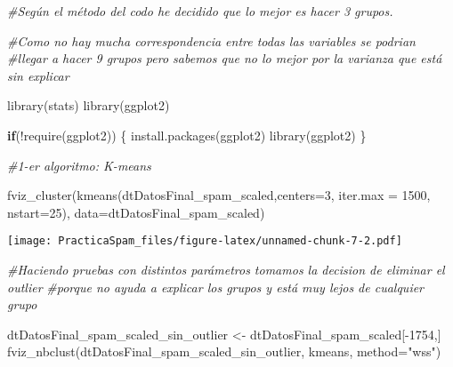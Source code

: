 \documentclass[
]{article}
\newenvironment{Shaded}{\begin{snugshade}}{\end{snugshade}}
\newcommand{\AttributeTok}[1]{\textcolor[rgb]{0.77,0.63,0.00}{#1}}
\newcommand{\CommentTok}[1]{\textcolor[rgb]{0.56,0.35,0.01}{\textit{#1}}}
\newcommand{\ControlFlowTok}[1]{\textcolor[rgb]{0.13,0.29,0.53}{\textbf{#1}}}
\newcommand{\DecValTok}[1]{\textcolor[rgb]{0.00,0.00,0.81}{#1}}
\newcommand{\FunctionTok}[1]{\textcolor[rgb]{0.00,0.00,0.00}{#1}}
\newcommand{\NormalTok}[1]{#1}
\newcommand{\OtherTok}[1]{\textcolor[rgb]{0.56,0.35,0.01}{#1}}
\newcommand{\SpecialCharTok}[1]{\textcolor[rgb]{0.00,0.00,0.00}{#1}}
\newcommand{\StringTok}[1]{\textcolor[rgb]{0.31,0.60,0.02}{#1}}
\begin{document}
\begin{Shaded}
\begin{Highlighting}[]
  \CommentTok{\#Según el método del codo he decidido que lo mejor es hacer 3 grupos.}
  
  \CommentTok{\#Como no hay mucha correspondencia entre todas las variables se podrian}
  \CommentTok{\#llegar a hacer 9 grupos pero sabemos que no lo mejor por la varianza que está sin explicar}
  
  
  
  \FunctionTok{library}\NormalTok{(stats)}
  \FunctionTok{library}\NormalTok{(ggplot2)}
  
  \ControlFlowTok{if}\NormalTok{(}\SpecialCharTok{!}\FunctionTok{require}\NormalTok{(}\StringTok{\textquotesingle{}ggplot2\textquotesingle{}}\NormalTok{)) \{}
    \FunctionTok{install.packages}\NormalTok{(}\StringTok{\textquotesingle{}ggplot2\textquotesingle{}}\NormalTok{)}
    \FunctionTok{library}\NormalTok{(}\StringTok{\textquotesingle{}ggplot2\textquotesingle{}}\NormalTok{)}
\NormalTok{  \}}
  
  \CommentTok{\#1{-}er algoritmo: K{-}means}
  
  \FunctionTok{fviz\_cluster}\NormalTok{(}\FunctionTok{kmeans}\NormalTok{(dtDatosFinal\_spam\_scaled,}\AttributeTok{centers=}\DecValTok{3}\NormalTok{, }\AttributeTok{iter.max =} \DecValTok{1500}\NormalTok{, }\AttributeTok{nstart=}\DecValTok{25}\NormalTok{), }\AttributeTok{data=}\NormalTok{dtDatosFinal\_spam\_scaled)}
\end{Highlighting}
\end{Shaded}

\texttt{[image: PracticaSpam\_files/figure-latex/unnamed-chunk-7-2.pdf]}

\begin{Shaded}
\begin{Highlighting}[]
  \CommentTok{\#Haciendo pruebas con distintos parámetros tomamos la decision de eliminar el outlier}
  \CommentTok{\#porque no ayuda a explicar los grupos y está muy lejos de cualquier grupo}
  
\NormalTok{  dtDatosFinal\_spam\_scaled\_sin\_outlier }\OtherTok{\textless{}{-}}\NormalTok{ dtDatosFinal\_spam\_scaled[}\SpecialCharTok{{-}}\DecValTok{1754}\NormalTok{,]}
  \FunctionTok{fviz\_nbclust}\NormalTok{(dtDatosFinal\_spam\_scaled\_sin\_outlier, kmeans, }\AttributeTok{method=}\StringTok{"wss"}\NormalTok{)}
\end{Highlighting}
\end{Shaded}
\end{document}
